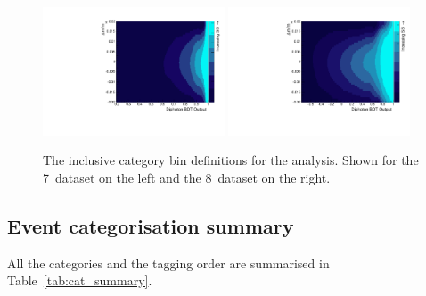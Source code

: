 \begin{figure}
  \includegraphics[width=0.48\textwidth]{selec_and_cats/plots/sideband_cats_7TeV_fix.pdf}
  \includegraphics[width=0.48\textwidth]{selec_and_cats/plots/sideband_cats_8TeV_fix.pdf}
  \caption[The inclusive category bin definitions for the \SMVA analysis]{The inclusive category bin definitions for the \SMVA analysis. Shown for the 7~\TeV dataset on the left and the 8~\TeV dataset on the right.}
  \label{fig:sideband_cats}
\end{figure}

\subsection{Event categorisation summary}

All the categories and the tagging order are summarised in Table~\ref{tab:cat_summary}.

